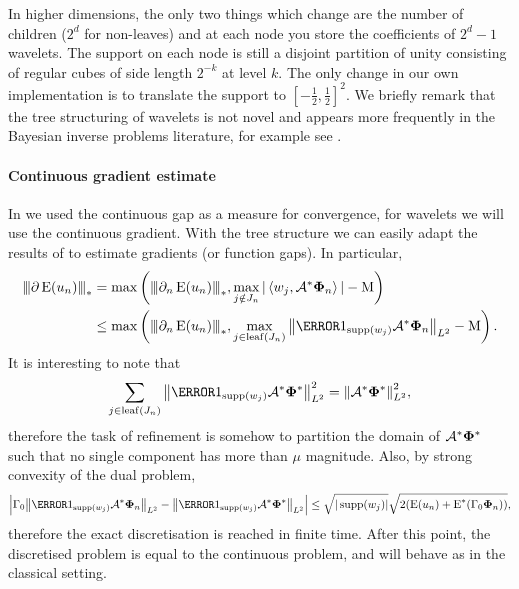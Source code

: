 \documentclass[10pt,a4paper,onecolumn]{article}
\numberwithin{equation}{section}
\newcommand{\Norm}[1]{{\left\vert\kern-0.25ex\left\vert\kern-0.25ex\left\vert #1 \right\vert\kern-0.25ex\right\vert\kern-0.25ex\right\vert}}
\newcommand{\norm}[1]{{\left\lVert #1 \right\rVert}}
\newcommand{\IP}[2]{\left\langle #1,#2 \right\rangle}\newcommand{\ip}[2]{#1 \vcenter{\hbox{\resizebox{6pt}{!}{\ensuremath\cdot}}} #2}
\newcommand{\op}[1]{\operatorname{#1}}\newcommand{\overtext}[2]{\stackrel{\text{#1}}{#2}}
\renewcommand{\vec}{\mathbf}
\newcommand*{\Func}[1]{%
	\IfEqCase{#1}{%
		{0}{\op{E}}%
		{1}{\op{F}}%
		{2}{\op{G}}%
		{3}{\op{H}}%
	}[\op{F}#1]%
}
\newcommand*{\varf}[1]{%
	\IfEqCase{#1}{%
		{0}{u}%
		{1}{v}%
		{2}{w}%
	}[u#1]%
}
\newcommand*{\vard}[1]{%
	\IfEqCase{#1}{%
		{0}{\varphi}%
		{1}{\psi}%
	}[\varphi #1]%
}
\newcommand*{\vars}[1]{%
	\IfEqCase{#1}{%
		{0}{\alpha}%
		{1}{\beta}%
		{2}{\gamma}%
		{3}{a}%
		{4}{b}%
		{5}{c}%
	}[k#1]%
}
\newcommand*{\data}[1]{%
	\IfEqCase{#1}{%
		{0}{\eta}%
		{1}{\nu}%
	}[g]%
}
\newcommand*{\vvard}[1]{\vec{\vard{#1}}}\newcommand*{\vdata}[1]{\vec{\data{#1}}}
\begin{document}
In higher dimensions, the only two things which change are the number of children ($2^d$ for non-leaves) and at each node you store the coefficients of $2^d-1$ wavelets. The support on each node is still a disjoint partition of unity consisting of regular cubes of side length $2^{-k}$ at level $k$. The only change in our own implementation is to translate the support to $[-\tfrac12,\tfrac12]^2$. We briefly remark that the tree structuring of wavelets is not novel and appears more frequently in the Bayesian inverse problems literature, for example see \citet{Castillo2019}.

\paragraph{Continuous gradient estimate}
In  we used the continuous gap as a measure for convergence, for wavelets we will use the continuous gradient. With the tree structure we can easily adapt the results of  to estimate gradients (or function gaps). In particular,
\begin{align}
	\Norm{\partial \Func0(\varf0_n)}_* &=\max\left(\Norm{\partial_n\Func0(\varf0_n)}_*, \max_{j\notin J_n} |\IP{w_j}{\A^*\vvard0_n}| -\mu \right) \\&\leq\max\left(\Norm{\partial_n\Func0(\varf0_n)}_*, \max_{j\in \op{leaf}(J_n)} \norm{\1_{\supp(w_j)}\A^*\vvard0_n}_{L^2} -\mu \right).\label{eq: wavelet error metric}
\end{align}
It is interesting to note that 
\begin{equation}
	\sum_{j\in\op{leaf}(J_n)} \norm{\1_{\supp(w_j)}\A^*\vvard0^*}_{L^2}^2 = \norm{\A^*\vvard0^*}_{L^2}^2,
\end{equation}
therefore the task of refinement is somehow to partition the domain of $\A^*\vvard0^*$ such that no single component has more than $\mu$ magnitude. Also, by strong convexity of the dual problem,
\begin{equation}
	\left|\vars2_0\norm{\1_{\supp(w_j)}\A^*\vvard0_n}_{L^2} - \norm{\1_{\supp(w_j)}\A^*\vvard0^*}_{L^2}\right| \leq \sqrt{|\supp(w_j)|}\sqrt{2(\Func0(\varf0_n)+\Func0^*(\vars2_0\vvard0_n))},
\end{equation}
therefore the exact discretisation is reached in finite time. After this point, the discretised problem is equal to the continuous problem, and  will behave as in the classical setting.
\end{document}
